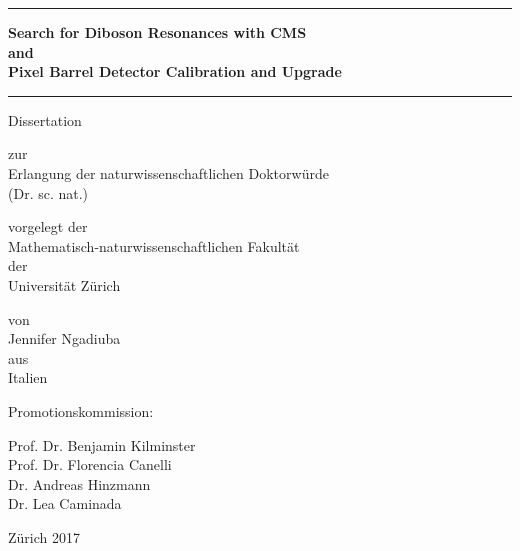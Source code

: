 

\begin{center}

  \thispagestyle{empty}
  {\parindent0cm
   \rule{\linewidth}{.3ex}}
  \begin{center}

    \bfseries\LARGE
    Search for Diboson Resonances with CMS\\ 
    and\\ 
    Pixel Barrel Detector 
    Calibration and Upgrade
  \end{center}
  \rule{\linewidth}{.3ex}

\par
\vspace{0.6 in}

{\LARGE Dissertation}
\vspace{0.1in}

zur \\
Erlangung der 
naturwissenschaftlichen Doktorw\"urde \\
(Dr. sc. nat.) \\
\par
\vspace{0.6in}


vorgelegt der\\
Mathematisch-naturwissenschaftlichen Fakult\"at \\
der \\
\vspace{0.05in}
{\LARGE Universit\"at Z\"urich}
\par
\vspace{0.3in}


\vspace{0.3in}
von \\
\vspace{0.05in}
{\LARGE Jennifer Ngadiuba} \\
aus \\
Italien \\
\par
\vspace{0.6in}


Promotionskommission:\\
\par
\vspace{0.1in}


Prof. Dr. Benjamin Kilminster\\
Prof. Dr. Florencia Canelli\\
Dr. Andreas Hinzmann\\
Dr. Lea Caminada\\

\par
\vspace{0.6in}


Z\"urich 2017

\end{center}
